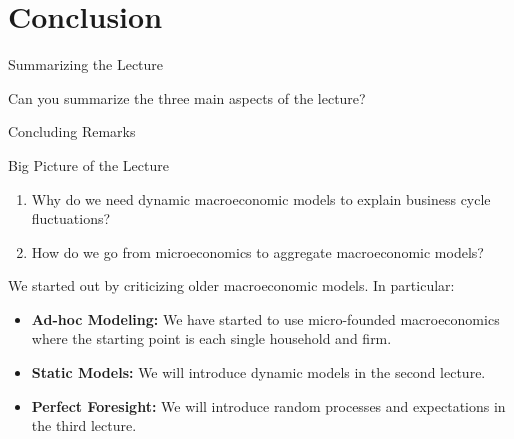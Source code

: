 \documentclass[10pt,c,aspectratio=1610,handout]{beamer}
\begin{document}
\section{Conclusion}%
\begin{frame}{Summarizing the Lecture}%
  \begin{center}%
    \begin{large}%
      Can you summarize the three main aspects of the lecture?%
    \end{large}%
  \end{center}%
\end{frame}%
\begin{frame}{Concluding Remarks}%
  \begin{block}{Big Picture of the Lecture}%
    \begin{enumerate}%
      \item Why do we need dynamic macroeconomic models to explain business cycle fluctuations?%
      \item How do we go from microeconomics to aggregate macroeconomic models?%
    \end{enumerate}%
  \end{block}%
  \pause%
  \vspace*{0.2in}%
  We started out by criticizing older macroeconomic models. In particular:
  \begin{itemize}%
    \item[$\blacktriangleright$] \textbf{Ad-hoc Modeling:} We have started to use micro-founded macroeconomics where the starting point is each single household and firm.%
    \pause%
    \item[$\blacktriangleright$] \textbf{Static Models:} We will introduce dynamic models in the second lecture.%
    \pause%
    \item[$\blacktriangleright$] \textbf{Perfect Foresight:} We will introduce random processes and expectations in the third lecture.%
  \end{itemize}%
\end{frame}%
\appendix%
\end{document}
